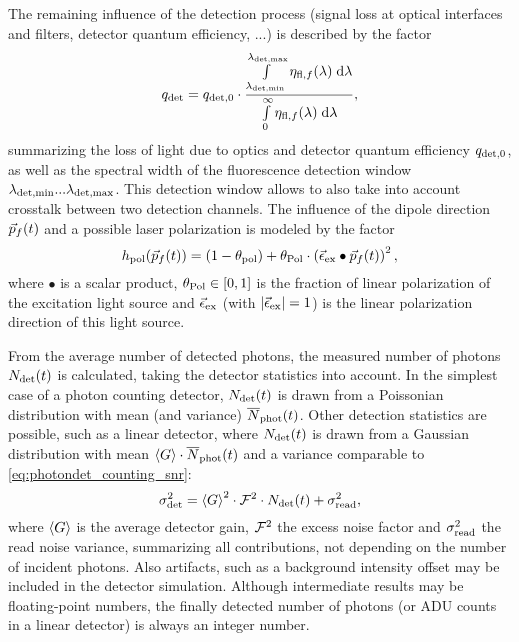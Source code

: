 The remaining influence of the detection process (signal loss at optical interfaces and filters, detector quantum efficiency, ...) is described by the factor
\begin{equation}\label{eq:app_sim_fcs_qdet}
  q_{\text{det}}=q_{\text{det},0}\cdot\frac{\int\limits_{\lambda_{\text{det,min}}}^{\lambda_{\text{det,max}}}\eta_{\text{fl},f}(\lambda)\;\mathrm{d}\lambda}{\int\limits_{0}^{\infty}\eta_{\text{fl},f}(\lambda)\;\mathrm{d}\lambda},
\end{equation}
summarizing the loss of light due to optics and detector quantum efficiency $q_{\text{det},0}$, as well as the spectral width of the fluorescence detection window $\lambda_{\text{det,min}}...\lambda_{\text{det,max}}$. This detection window allows to also take into account crosstalk between two detection channels. The influence of the dipole direction $\vec{p}_f(t)$ and a possible laser polarization is modeled by the factor
\begin{equation}\label{eq:app_sim_fcs_hpol}
  h_{\text{pol}}(\vec{p}_f(t))=(1-\theta_{\text{pol}})+\theta_{\text{Pol}}\cdot\left(\vec{\epsilon}_{\text{ex}}\bullet\vec{p}_f(t)\right)^2,
\end{equation}
where $\bullet$ is a scalar product, $\theta_{\text{Pol}}\in[0,1]$ is the fraction of linear polarization of the excitation light source and $\vec{\epsilon}_{\text{ex}}$ (with $|\vec{\epsilon}_{\text{ex}}|=1$) is the linear polarization direction of this light source.

From the average number of detected photons, the measured number of photons ${N}_{\text{det}}(t)$ is calculated, taking the detector statistics into account. In the simplest case of a photon counting detector, ${N}_{\text{det}}(t)$ is drawn from a Poissonian distribution with mean (and variance) $\overline{N}_{\text{phot}}(t)$. Other detection statistics are possible, such as a linear detector, where ${N}_{\text{det}}(t)$ is drawn from a Gaussian distribution with mean $\left\langle G\right\rangle\cdot\overline{N}_{\text{phot}}(t)$ and a variance comparable to \eqref{eq:photondet_counting_snr}:
\begin{equation}\label{eq:app_sim_fcs_lindetnoise}
  \sigma_{\text{det}}^2=\left\langle G\right\rangle^2\cdot\mathcal{F}^2\cdot{N}_{\text{det}}(t)+\sigma_{\text{read}}^2,
\end{equation}
where $\left\langle G\right\rangle$ is the average detector gain, $\mathcal{F}^2$ the excess noise factor and $\sigma_{\text{read}}^2$ the read noise variance, summarizing all contributions, not depending on the number of incident photons. Also artifacts, such as a background intensity offset may be included in the detector simulation. Although intermediate results may be floating-point numbers, the finally detected number of photons (or ADU counts in a linear detector) is always an integer number.

